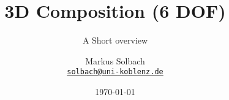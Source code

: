 \documentclass[10pt,a4paper]{scrartcl}
\author{Markus Solbach \\ \href{mailto:solbach@uni-koblenz.de}{\texttt{solbach@uni-koblenz.de}}}
\date{\today}
\begin{document}
\title{3D Composition (6 DOF)}
\subtitle{A Short overview}
\maketitle
\newpage



\section{}


\end{document}
